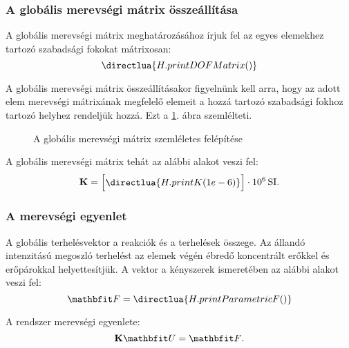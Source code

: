 \subsubsection{A globális merevségi mátrix összeállítása}

A globális merevségi mátrix meghatározásához írjuk fel az egyes elemekhez
tartozó szabadsági fokokat mátrixosan:
\begin{equation}
  \directlua{H.printDOFMatrix()}
  \label{eq:DOF}
\end{equation}

A globális merevségi mátrix összeállításakor figyelnünk kell arra, hogy az adott
elem merevségi mátrixának megfelelő elemeit a hozzá tartozó szabadsági fokhoz
tartozó helyhez rendeljük hozzá. Ezt a \ref{fig:K}. ábra szemlélteti.
\begin{figure}[H]
  \centering
  
  \caption{A globális merevségi mátrix szemléletes felépítése}
  \label{fig:K}
\end{figure}

A globális merevségi mátrix tehát az alábbi alakot veszi fel:
\begin{equation}
  \siplaces{3}
  \rmat K = \begin{bmatrix}
    \directlua{H.printK(1e-6)}
  \end{bmatrix} \cdot 10^6 \, \mathrm{SI}
  \text.
  \label{eq:K}
\end{equation}

\subsubsection{A merevségi egyenlet}

A globális terhelésvektor a reakciók és a terhelések összege. Az állandó
intenzitású megoszló terhelést az elemek végén ébredő koncentrált erőkkel
és erőpárokkal helyettesítjük. A vektor a kényszerek ismeretében az alábbi
alakot veszi fel:
\begin{equation}
  \def\arraystretch{1.2}
  \rvec{F} =
  \directlua{H.printParametricF()}
  \label{eq:F-param}
\end{equation}

A rendszer merevségi egyenlete:
\begin{equation}
  \rmat K \rvec U = \rvec F
  \text.
  \label{eq:KUF}
\end{equation}

